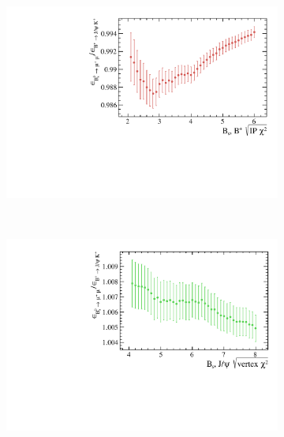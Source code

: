 \begin{figure}
    \centering
    \begin{subfigure}[b]{0.4\textwidth}
        \includegraphics[width=\textwidth]{./Figs/Selection/BsMuMu_JPsiK_IP.pdf}
        \caption{ }
        \label{fig:IPS_ratio}
    \end{subfigure}
    ~ %
    \begin{subfigure}[b]{0.4\textwidth}
        \includegraphics[width=\textwidth]{./Figs/Selection/BsMuMu_JpsiK_vertex.pdf}
        \caption{ }
        \label{fig:CHI2_ratio}
    \end{subfigure}
    ~ %


\end{figure}
